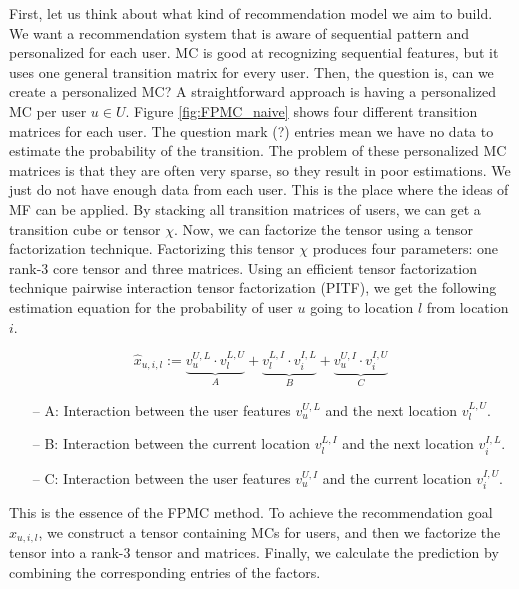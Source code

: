 \documentclass{sig-alternate}
\begin{document}
First, let us think about what kind of recommendation model we aim to build. 
We want a recommendation system that is aware of sequential pattern and personalized for each user.
MC is good at recognizing sequential features, but it uses one general transition matrix for every user. 
Then, the question is, can we create a personalized MC?
A straightforward approach is having a personalized MC per user $u \in U$. 
Figure \ref{fig:FPMC_naive} shows four different transition matrices for each user. 
The question mark (?) entries mean we have no data to estimate the probability of the transition. The problem of these personalized 
MC matrices is that they are often very sparse, so they result in poor estimations. We just do not have enough data from
each user. This is the place where the ideas of MF can be applied. By stacking all transition matrices of users, 
we can get a transition cube or tensor $\chi$. Now, we can factorize the tensor using a tensor factorization technique. 
Factorizing this tensor $\chi$ produces four parameters: one rank-3 core tensor and three matrices. Using an efficient tensor 
factorization technique pairwise interaction tensor factorization (PITF), we get the following 
estimation equation for the probability of user $u$ going to location $l$ from location $i$. \cite{Rendle:2010:PIT}

\begin{equation}
	\hat{x}_{u,i,l} := \underbrace{v_u^{U,L} \cdot v_l^{L,U}}_{A} + \underbrace{v_l^{L,I} \cdot v_i^{I,L}}_{B} 
	+ \underbrace{v_u^{U,I} \cdot v_i^{I,U}}_{C}
\label{eq:FPMC}
\end{equation}

\begin{itemize}
\item[--] A: Interaction between the user features $v_u^{U,L}$ and the next location $v_l^{L,U}$.
\item[--] B: Interaction between the current location $v_l^{L,I}$ and the next location $v_i^{I,L}$.
\item[--] C: Interaction between the user features $v_u^{U,I}$ and the current location $v_i^{I,U}$.
\end{itemize}

This is the essence of the FPMC method. To achieve the recommendation goal $\hat{x}_{u,i,l}$, we 
construct a tensor containing MCs for users, and then we factorize the tensor into a rank-3 tensor 
and matrices. Finally, we calculate the prediction by combining the corresponding entries of the
factors. 
\end{document}
